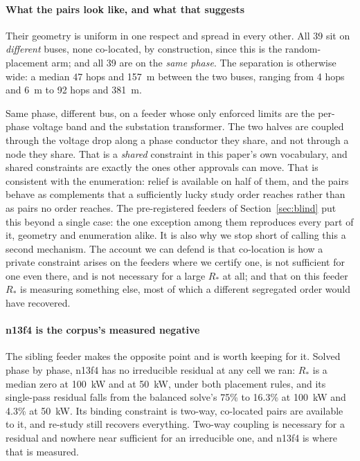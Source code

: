 \documentclass[review,authoryear,12pt]{elsarticle}
\begin{document}
\paragraph{What the pairs look like, and what that suggests}
Their geometry is uniform in one respect and spread in every other. All 39 sit
on \emph{different} buses, none co-located, by construction, since this
is the random-placement arm; and all 39 are on the \emph{same phase}. The
separation is otherwise wide: a median 47 hops and 157~m between the two buses,
ranging from 4 hops and 6~m to 92 hops and 381~m.

Same phase, different bus, on a feeder whose only enforced limits are the
per-phase voltage band and the substation transformer. The two halves are
coupled through the voltage drop along a phase conductor they share, and not
through a node they share. That is a \emph{shared} constraint in this
paper's own vocabulary, and shared constraints are exactly the ones other
approvals can move. That is consistent with the enumeration: relief is
available on half of them, and the pairs behave as complements that a
sufficiently lucky study order reaches rather than as pairs no order reaches.
The pre-registered feeders of Section~\ref{sec:blind} put this beyond a single
case: the one exception among them reproduces every part of it, geometry and
enumeration alike. It is also why we stop short of calling this a second
mechanism. The account
we can defend is that co-location is how a private constraint arises on the
feeders where we certify one, is not sufficient for one even there, and is not
necessary for a large $R_{\ast}$ at all; and that on this feeder $R_{\ast}$
is measuring something else, most of which a different segregated order would
have recovered.

\paragraph{n13f4 is the corpus's measured negative}
The sibling feeder makes the opposite point and is worth keeping for it. Solved
phase by phase, n13f4 has no irreducible residual at any cell we ran: $R_{\ast}$
is a median zero at 100~kW and at 50~kW, under both placement rules, and its
single-pass residual falls from the balanced solve's 75\% to 16.3\% at 100~kW
and 4.3\% at 50~kW. Its binding constraint is two-way, co-located pairs are
available to it, and re-study still recovers everything. Two-way coupling is
necessary for a residual and nowhere near sufficient for an irreducible one, and
n13f4 is where that is measured.
\end{document}
